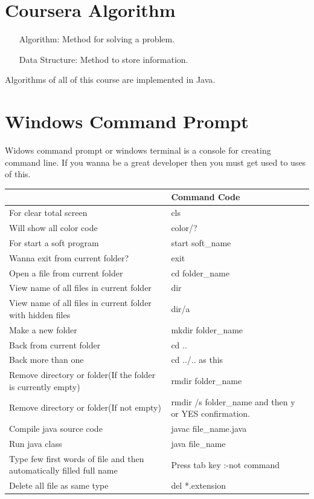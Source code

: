 \documentclass[10 pt]{book}
\begin{document}
\chapter{Coursera Algorithm}
\begin{itemize}
	\item[Algorithm: ] Method for solving a problem.
	\item[Data Structure: ] Method to store information.
\end{itemize}
Algorithms of all of this course are implemented in Java.

\chapter{Windows Command Prompt}
Widows command prompt or windows terminal is a console for creating command line. If you wanna be a great developer then you must get used to uses of this.\\
\begin{center}
	\begin{tabularx}{0.9\textwidth}
	{|>{\raggedright\arraybackslash}X
	 |>{\raggedleft\arraybackslash}X	
	|}
		\hline
		{\color{red}Task}& {\color{red}Command Code}\\
		\hline
		\hline
		For clear total screen & cls\\
		\hline
		Will show all color code & color/?\\
		\hline
		For start a soft program & start soft\_name\\
		\hline
		Wanna exit from current folder? & exit\\
		\hline
		Open a file from current folder & cd folder\_name\\
		\hline
		View name of all files in current folder & dir\\
		\hline
		View name of all files in current folder with hidden files & dir/a\\
		\hline
		Make a new folder & mkdir folder\_name\\
		\hline
		Back from current folder & cd ..\\
		\hline
		Back more than one & cd ../.. as this\\
		\hline
		Remove directory or folder(If the folder is currently empty) & rmdir folder\_name\\
		\hline
		Remove directory or folder(If not empty) & rmdir /s folder\_name and then y or YES confirmation.\\
		\hline
		Compile java source code & javac file\_name.java\\
		\hline
		Run java class & java file\_name\\
		\hline
		Type few first words of file and then automatically filled full name & Press tab key :-not command\\
		\hline
		Delete all file as same type & del *.extension\\
		\hline
		
	\end{tabularx}
\end{center}
\end{document}
